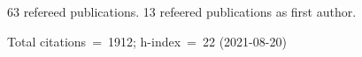63 refereed publications. 13 refeered publications as first author.

Total citations~=~1912; h-index~=~22 (2021-08-20)